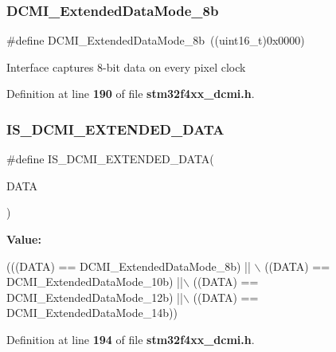 \subsubsection{D\+C\+M\+I\+\_\+\+Extended\+Data\+Mode\+\_\+8b}
{\footnotesize\ttfamily \#define D\+C\+M\+I\+\_\+\+Extended\+Data\+Mode\+\_\+8b~((uint16\+\_\+t)0x0000)}

Interface captures 8-\/bit data on every pixel clock 

Definition at line \textbf{ 190} of file \textbf{ stm32f4xx\+\_\+dcmi.\+h}.

\mbox{\label{group__DCMI__Extended__Data__Mode_gaf28a103f095fed769e757334933a6981}} 
\subsubsection{I\+S\+\_\+\+D\+C\+M\+I\+\_\+\+E\+X\+T\+E\+N\+D\+E\+D\+\_\+\+D\+A\+TA}
{\footnotesize\ttfamily \#define I\+S\+\_\+\+D\+C\+M\+I\+\_\+\+E\+X\+T\+E\+N\+D\+E\+D\+\_\+\+D\+A\+TA(\begin{DoxyParamCaption}\item[{}]{D\+A\+TA }\end{DoxyParamCaption})}

{\bfseries Value\+:}
\begin{DoxyCode}
(((DATA) == DCMI_ExtendedDataMode_8b) || \(\backslash\)
                                    ((DATA) == DCMI_ExtendedDataMode_10b) ||\(\backslash\)
                                    ((DATA) == DCMI_ExtendedDataMode_12b) ||\(\backslash\)
                                    ((DATA) == DCMI_ExtendedDataMode_14b))
\end{DoxyCode}


Definition at line \textbf{ 194} of file \textbf{ stm32f4xx\+\_\+dcmi.\+h}.

